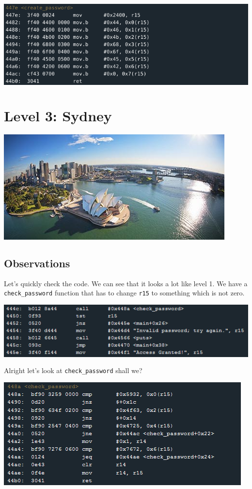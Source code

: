 \documentclass[a4paper,11pt]{article}
\begin{document}
\includegraphics{img/1_5.png}

\section{Level 3: Sydney}\label{level-3-sydney}

\includegraphics{img/3_2.PNG}

\subsection{Observations}\label{observations}

Let's quickly check the code. We can see that it looks a lot like level
1. We have a \texttt{check\_password} function that has to change
\texttt{r15} to something which is not zero.

\includegraphics{img/2_1.PNG}

Alright let's look at \texttt{check\_password} shall we?

\includegraphics{img/2_2.PNG}
\end{document}

